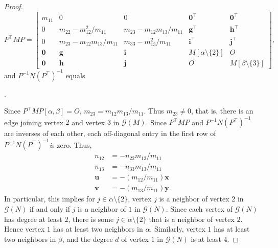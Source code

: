 \documentclass[12pt]{article}
\theoremstyle{definition}
\theoremstyle{definition}
\theoremstyle{definition}
\numberwithin{figure}{section}
\numberwithin{equation}{section}
\newcommand{\G}{\mathcal{G}}
\begin{document}
\begin{proof}
\[ 
P^{\top}MP =
\left[ \begin{array}{ccc|c|c}
m_{11} & 0 & 0 & \mathbf 0^{\top} & \mathbf{0}^{\top}\\
0 & m_{22}-m_{12}^2/m_{11} & m_{23}-m_{12}m_{13}/m_{11} & \mathbf g^{\top} & \mathbf h^{\top} \\
0 & m_{23}-m_{12}m_{13}/m_{11} & m_{33}-m_{13}^2/m_{11}  & \mathbf i^{\top} & \mathbf j^{\top}  \\ \hline
\mathbf 0 & \mathbf g &\mathbf i &  M[\alpha\setminus \{2\} ] & O 
\\ \hline 
\mathbf 0 & \mathbf h & \mathbf j &  O & M[\beta\setminus \{ 3 \}] 
\end{array} \right] ,  
\] 
and 
$ P^{-1}N (P^{\top})^{-1} $
equals 
\begin{center}
.
\end{center}
Since $P^{\top} MP[\alpha , \beta]=O$, $m_{23}=m_{12}m_{13}/m_{11}$.  
Thus $m_{23} \neq 0$, that is,  there is an edge joining vertex $2$ and vertex $3$ in $\G(M)$. 
Since $P^{\top}MP$ and $P^{-1}N(P^{\top})^{-1}$ are inverses of each other, each off-diagonal entry in the first row of 
$P^{-1} N(P^{\top})^{-1}$\emph  is zero. 
Thus, 
\begin{align*}
n_{12}& =-n_{22}m_{12}/m_{11}\\
n_{13}&=-n_{33}m_{13}/m_{11}\\
\mathbf u& = -(m_{12}/m_{11}) \mathbf x \\ 
\mathbf v&= -(m_{13}/m_{11}) \mathbf y. 
\end{align*}
In particular, this implies for $j \in \alpha \setminus \{2\} $,  vertex  $j$ is a neighbor of vertex $2$ in $\G(N)$ if 
and only if $j$ is a neighbor of $1$ in $\G(N)$.
Since each vertex of $\G(N)$ has degree at least $2$, there is some $j \in \alpha \setminus \{2\} $ that  is a neighbor of vertex $2$. 
Hence vertex $1$ has at least two neighbors in $\alpha$. Similarly, vertex $1$ has at least two neighbors in $\beta$, and the degree $d$ 
of vertex $1$ in 
$\G(N)$ is at least $4$.



\end{proof}
\end{document}
